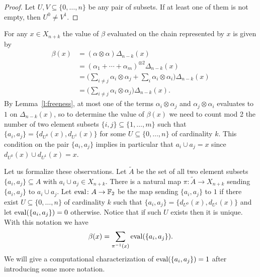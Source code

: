 \begin{proof}
	Let $U, V \subseteq \{0, \dots, n\}$ be any pair of subsets. If at least one of them is not empty, then $U^0 \neq V^1$.
\end{proof}

For any $x \in X_{n+k}$ the value of $\beta$ evaluated on the chain represented by $x$ is given by 
\begin{align*}
\beta(x) & =
(\alpha \otimes \alpha) \Delta_{n-k}(x) \\ & =
(\alpha_1 + \cdots + \alpha_m)^{\otimes 2} \Delta_{n-k}(x) \\ & =
\Big(\sum_{i \neq j} \alpha_i \otimes \alpha_j + \sum_{i} \alpha_i \otimes \alpha_i \Big)
\Delta_{n-k}(x) \\ & =
\Big(\sum_{i \neq j} \alpha_i \otimes \alpha_j\Big)
\Delta_{n-k}(x).
\end{align*}
By Lemma~\ref{l:freeness}, at most one of the terms $\alpha_i \otimes \alpha_j$ and $\alpha_j \otimes \alpha_i$ evaluates to $1$ on $\Delta_{n-k}(x)$, so to determine the value of $\beta(x)$ we need to count mod 2 the number of two element subsets $\{i,j\} \subseteq \{1,\dots, m\}$ such that $\{a_i, a_j\} = \{d_{U^0}(x), d_{U^1}(x)\}$ for some $U \subseteq \{0, \dots, n\}$ of cardinality $k$.
This condition on the pair $\{a_i, a_j\}$ implies in particular that $a_i \cup a_j = x$ since $d_{U^0}(x) \cup d_{U^1}(x) = x$.

Let us formalize these observations.
Let $\widetilde{A}$ be the set of all two element subsets $\{a_i, a_j\} \subseteq A$ with $a_i \cup a_j \in X_{n+k}$.
There is a natural map $\pi \colon \widetilde{A} \to X_{n+k}$ sending $\{a_i, a_j\}$ to $a_i \cup a_j$.
Let $\operatorname{eval} \colon A \to \mathbb{F}_2$ be the map sending $\{a_i, a_j\}$ to $1$ if there exist $U \subseteq \{0,\dots,n\}$ of cardinality $k$ such that $\{a_i, a_j\} = \{d_{U^0}(x), d_{U^1}(x)\}$ and let $\operatorname{eval}(\{a_i, a_j\}) = 0$ otherwise.
Notice that if such $U$ exists then it is unique.
With this notation we have
\begin{equation*}
\beta(x) = \sum_{\pi^{-1}(x)} \operatorname{eval}(\{a_i, a_j\}).
\end{equation*}
We will give a computational characterization of $\operatorname{eval}(\{a_i, a_j\}) = 1$ after introducing some more notation.

